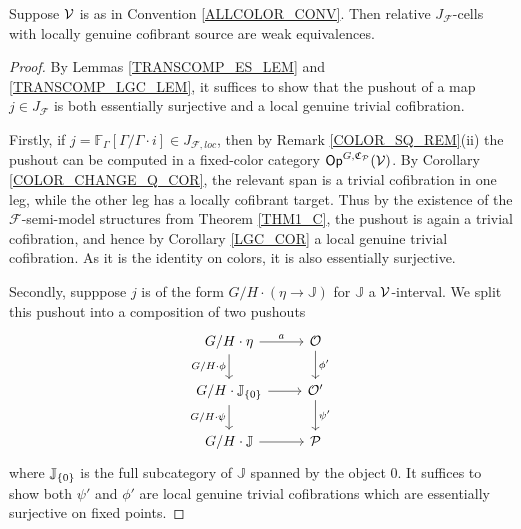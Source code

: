\documentclass[a4paper,10pt
,draft
]{article}%
\renewcommand{\F}{\mathcal F}
\newcommand{\J}{\mathbb J}
\renewcommand{\1}{\eta}%
\begin{document}
\begin{proposition}\label{J-CELL_PROP}
      Suppose $\mathcal V$ is as in Convention \ref{ALLCOLOR_CONV}. %
      Then relative $J_{\F}$-cells with locally genuine cofibrant source are weak equivalences.
\end{proposition}
\begin{proof}
      By Lemmas \ref{TRANSCOMP_ES_LEM} and \ref{TRANSCOMP_LGC_LEM}, it suffices to show that
      the pushout of a map $j \in J_\F$ is both
      essentially surjective and a local genuine trivial cofibration.

      Firstly, if $j = \mathbb F_\Gamma[\Gamma/\Gamma \cdot i] \in J_{\F, loc}$,
      then by Remark \ref{COLOR_SQ_REM}(ii) the pushout can be computed in a fixed-color category $\mathsf{Op}^{G,\mathfrak C_{\mathcal{P}}}(\mathcal V)$.
      By Corollary \ref{COLOR_CHANGE_Q_COR}, the relevant span is a trivial cofibration in one leg, while the other leg has a locally cofibrant target.
      Thus by the existence of the $\F$-semi-model structures from Theorem \ref{THM1_C},
      the pushout is again a trivial cofibration, and hence by Corollary \ref{LGC_COR} a local genuine trivial cofibration.
      As it is the identity on colors, it is also essentially surjective.

      Secondly, supppose $j$ is of the form $G/H \cdot (\1 \to \J)$ for $\J$ a $\mathcal V$-interval.
      We split this pushout into a composition of two pushouts
      \begin{equation}
            \begin{tikzcd}
                  G/H \cdot \1 \arrow[r, "a"] \arrow[d, "G/H \cdot \phi"']
                  &
                  \O \arrow[d,"\phi'"]
                  \\
                  G/H \cdot \J_{\set{0}} \arrow[r] \arrow[d, "G/H \cdot \psi"']
                  &
                  \O' \arrow[d,"\psi'"]
                  \\
                  G/H \cdot \J \arrow[r]
                  &
                  \P
            \end{tikzcd}
      \end{equation}
      where $\J_{\set{0}}$ is the full subcategory of $\J$ spanned by the object $0$.
      It suffices to show both $\psi'$ and $\phi'$ are local genuine trivial cofibrations which are essentially surjective on fixed points. 


\end{proof}
\end{document}
